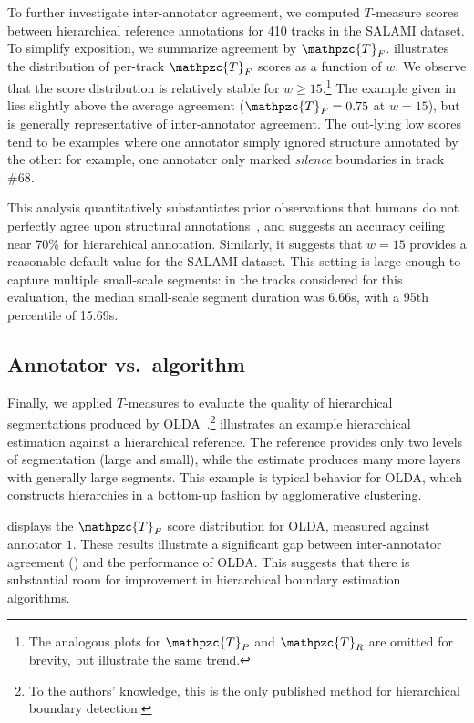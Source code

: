 \documentclass{article}
\def\shag{\ensuremath{\mathpzc{T}}}
\begin{document}
To further investigate inter-annotator agreement, we computed $T$-measure scores between hierarchical
reference annotations for 410 tracks in the SALAMI dataset.  To simplify exposition, we
summarize agreement by $\shag_F$.  illustrates the distribution of
per-track $\shag_F$ scores as a function of $w$.  We observe that the score distribution is relatively stable
for $w \geq 15$.\footnote{The analogous plots for $\shag_P$ and $\shag_R$ are omitted for brevity, but illustrate the same
trend.} 
The example given in  lies slightly above the average agreement
($\shag_F = 0.75$ at $w=15$),
but is generally representative of inter-annotator agreement.
The out-lying low scores tend to be examples where one annotator simply ignored structure annotated
by the other: for example, one annotator only marked \emph{silence} boundaries in track \#68.

This analysis quantitatively substantiates prior observations that humans do not perfectly agree upon structural
annotations~\cite{Smith2013}, and suggests an accuracy ceiling near 70\% for hierarchical annotation.
Similarly, it suggests that $w=15$ provides a reasonable default value for the SALAMI dataset.  This setting
is large enough to capture multiple small-scale segments: in the tracks considered for this evaluation, 
the median small-scale segment duration was 6.66s, with a 95th percentile of 15.69s.

\subsection{Annotator vs.\ algorithm}
Finally, we applied $T$-measures to evaluate the quality of hierarchical segmentations produced by
OLDA~\cite{McFee2014}.\footnote{To the authors' knowledge, this is the only published method for
hierarchical boundary detection.}
 illustrates an example hierarchical estimation against a hierarchical reference.
The reference provides only two levels of segmentation (large and small), while the 
estimate produces many more layers with generally large segments.
This example is typical behavior for OLDA, which constructs hierarchies in a bottom-up fashion by
agglomerative clustering.

 displays the $\shag_F$ score distribution for OLDA, measured against annotator $1$.
These results illustrate a significant gap between inter-annotator agreement
() and the performance of OLDA.  This suggests that there is substantial room for
improvement in hierarchical boundary estimation algorithms.
\end{document}
